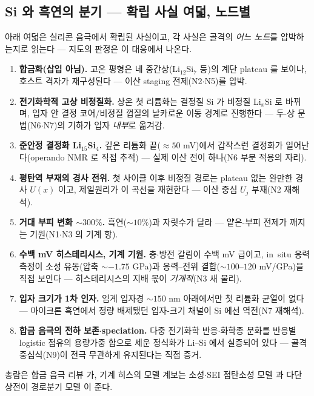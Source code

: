 \subsection{Si 와 흑연의 분기 --- 확립 사실 여덟, 노드별}\label{ssec:si-stress}
아래 여덟은 실리콘 음극에서 확립된 사실이고, 각 사실은 골격의 \emph{어느 노드}를 압박하는지로 읽는다
--- 지도의 판정은 이 대응에서 나온다.

\begin{enumerate}[label=(\roman*),leftmargin=2.2em,itemsep=1.5pt]
\item \textbf{합금화(삽입 아님).} 고온 평형은 네 중간상(Li$_{12}$Si$_7$ 등)의 계단 plateau 를
보이나\cite{wen_huggins1981}, 호스트 격자가 재구성된다 --- 이산 staging 전제(N2$\cdot$N5)를 압박.
\item \textbf{전기화학적 고상 비정질화.} 상온 첫 리튬화는 결정질 Si 가 비정질 Li$_x$Si 로 바뀌며,
입자 안 결정 코어/비정질 껍질의 날카로운 이동 경계로 진행한다\cite{limthongkul2003,li_dahn2007} ---
두-상 문법(N6$\cdot$N7)의 기하가 입자 \emph{내부}로 옮겨감.
\item \textbf{준안정 결정화 Li$_{15}$Si$_4$.} 깊은 리튬화 끝($\approx50$ mV)에서 갑작스런 결정화가
일어난다\cite{obrovac_christensen2004}(operando NMR 로 직접 추적\cite{ogata_nmr2014}) --- 실제 이산
전이 하나(N6 부분 적용의 자리).
\item \textbf{평탄역 부재의 경사 전위.} 첫 사이클 이후 비정질 경로는 plateau 없는 완만한 경사 $U(x)$ 이고,
제일원리가 이 곡선을 재현한다\cite{chevrier_dahn2009} --- 이산 중심 $U_j$ 부재(N2 재해석).
\item \textbf{거대 부피 변화 $\sim300\%$.}\cite{beaulieu2001} 흑연($\sim10\%$)과 자릿수가 달라 ---
얕은-부피 전제가 깨지는 기원(N1$\cdot$N3 의 기계 항).
\item \textbf{수백 mV 히스테리시스, 기계 기원.} 충$\cdot$방전 갈림이 수백 mV 급이고, in~situ 응력 측정이
소성 유동(압축 $\sim-1.75$ GPa)과 응력--전위 결합($\sim100$--$120$ mV/GPa)을 직접
보인다\cite{sethuraman_stressevo2010,sethuraman_stresspot2010} --- 히스테리시스의 지배 몫이
\emph{기계적}(N3 새 물리).
\item \textbf{입자 크기가 1차 인자.} 임계 입자경 $\sim150$ nm 아래에서만 첫 리튬화 균열이
없다\cite{liu_sizefracture2012} --- 마이크론 흑연에서 정량 배제됐던 입자-크기 채널이 Si 에선 역전(N7 재해석).
\item \textbf{합금 음극의 전하 보존$\cdot$speciation.} 다중 전기화학 반응$\cdot$화학종 분화를 반응별
logistic 점유의 용량가중 합으로 세운 정식화가 Li--Si 에서 실증되어
있다\cite{verbrugge_lisi2016} --- 골격 중심식(N9)이 전극 무관하게 유지된다는 직접 증거.
\end{enumerate}
총람은 합금 음극 리뷰\cite{obrovac_chevrier2014} 가, 기계 히스의 모델 계보는 소성$\cdot$SEI 점탄소성
모델\cite{koebbing2024} 과 다단 상전이 경로분기 모델\cite{jiang_sihys2020} 이 준다.

